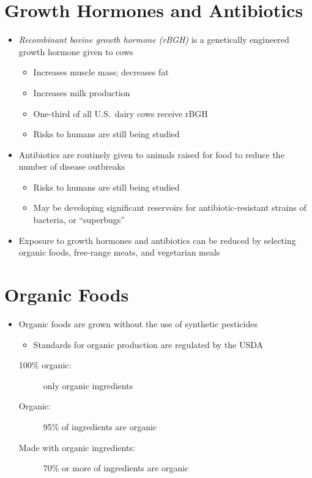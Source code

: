 \documentclass[title={Chapter 12}]{fdsn201notes}
\begin{document}
\section{Growth Hormones and Antibiotics}\label{sec:growth-hormones-and-antibiotics}
\begin{itemize}
	\item \emph{Recombinant bovine growth hormone (rBGH)} is a genetically engineered growth hormone given to cows
	\begin{itemize}
		\item Increases muscle mass; decreases fat
		\item Increases milk production
		\item One-third of all U.S.\ dairy cows receive rBGH
		\item Risks to humans are still being studied
	\end{itemize}
	\item Antibiotics are routinely given to animals raised for food to reduce the number of disease outbreaks
	\begin{itemize}
		\item Risks to humans are still being studied
		\item May be developing significant reservoirs for antibiotic-resistant strains of bacteria, or ``superbugs''
	\end{itemize}
	\item Exposure to growth hormones and antibiotics can be reduced by selecting organic foods, free-range meats, and vegetarian meals
\end{itemize}

\section{Organic Foods}\label{sec:organic-foods}
\begin{itemize}
	\item Organic foods are grown without the use of synthetic pesticides
	\begin{itemize}
		\item Standards for organic production are regulated by the USDA
	\end{itemize}
	\begin{description}
		\item[100\% organic:] only organic ingredients
		\item[Organic:] 95\% of ingredients are organic
		\item[Made with organic ingredients:] 70\% or more of ingredients are organic
	\end{description}
\end{itemize}
\end{document}
